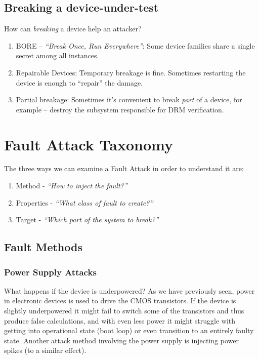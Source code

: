 \subsection*{Breaking a device-under-test}\label{subsec:breaking_a_device_under_test}
How can \emph{breaking} a device help an attacker?

\begin{enumerate}
	\item BORE -- \textit{``Break Once, Run Everywhere''}: Some device families
	share a single secret among all instances.
	\item Repairable Devices: Temporary breakage is fine. Sometimes restarting
	the device is enough to ``repair'' the damage.
	\item Partial breakage: Sometimes it's convenient to break \emph{part} of a
	device, for example -- destroy the subsystem responsible for DRM
	verification.
\end{enumerate}

\section{Fault Attack Taxonomy}\label{sec:fault_attack_taxonomy}
The three ways we can examine a Fault Attack in order to understand it are:
\begin{enumerate}
	\item Method - \emph{``How to inject the fault?''}
	\item Properties - \emph{``What class of fault to create?''}
	\item Target - \emph{``Which part of the system to break?''}
\end{enumerate}

\subsection{Fault Methods}\label{subsec:fault_methods}

\subsubsection{Power Supply Attacks}\label{subsubsec:power_supply_attacks}
What happens if the device is underpowered? As we have previously seen, power in
electronic devices is used to drive the CMOS transistors. If the device is
slightly underpowered it might fail to switch some of the transistors and thus
produce false calculations, and with even less power it might  struggle with
getting into operational state (boot loop) or even transition to an entirely
faulty state. Another attack method involving the power supply is injecting
power spikes (to a similar effect).

